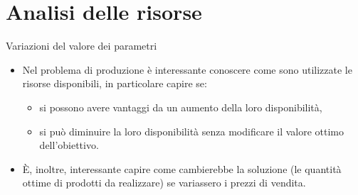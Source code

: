 \documentclass{beamer}
\begin{document}
\section{Analisi delle risorse}

\begin{frame}{Variazioni del valore dei parametri}
\begin{itemize}
\item 
  Nel problema di produzione \`e interessante conoscere come
  sono utilizzate le risorse disponibili,
  in particolare capire se:
  \begin{itemize}
  \item 
  si possono avere vantaggi da un aumento della loro disponibilit\`a,
  \item 
  si può diminuire la loro disponibilit\`a senza modificare il valore ottimo dell'obiettivo.
  \end{itemize}
  
  \item \`E, inoltre, interessante capire come cambierebbe la soluzione
  (le quantità ottime di prodotti da realizzare)
  se variassero i prezzi di vendita.
\end{itemize}
\end{frame}
\end{document}
